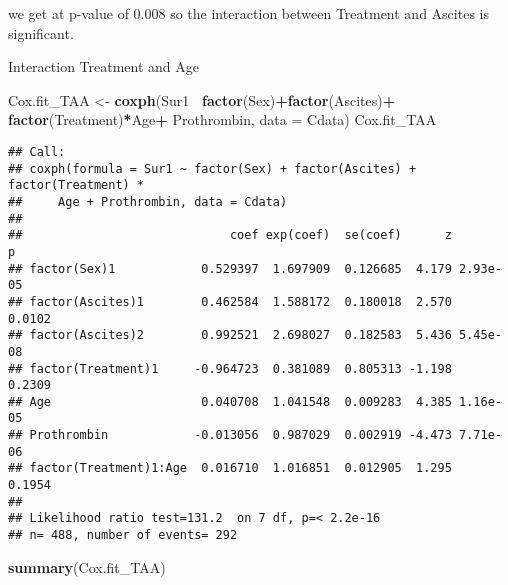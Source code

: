 \documentclass[
]{article}
\newenvironment{Shaded}{\begin{snugshade}}{\end{snugshade}}
\newcommand{\DataTypeTok}[1]{\textcolor[rgb]{0.13,0.29,0.53}{#1}}
\newcommand{\KeywordTok}[1]{\textcolor[rgb]{0.13,0.29,0.53}{\textbf{#1}}}
\newcommand{\NormalTok}[1]{#1}
\newcommand{\OperatorTok}[1]{\textcolor[rgb]{0.81,0.36,0.00}{\textbf{#1}}}
\newcommand{\StringTok}[1]{\textcolor[rgb]{0.31,0.60,0.02}{#1}}
\begin{document}
we get at p-value of 0.008 so the interaction between Treatment and
Ascites is significant.

Interaction Treatment and Age

\begin{Shaded}
\begin{Highlighting}[]
\NormalTok{Cox.fit_TAA <-}\StringTok{ }\KeywordTok{coxph}\NormalTok{(Sur1}\OperatorTok{~}\StringTok{ }\KeywordTok{factor}\NormalTok{(Sex)}\OperatorTok{+}\KeywordTok{factor}\NormalTok{(Ascites)}\OperatorTok{+}\StringTok{ }\KeywordTok{factor}\NormalTok{(Treatment)}\OperatorTok{*}\NormalTok{Age}\OperatorTok{+}\StringTok{ }\NormalTok{Prothrombin, }\DataTypeTok{data =}\NormalTok{ Cdata)}
\NormalTok{Cox.fit_TAA}
\end{Highlighting}
\end{Shaded}

\begin{verbatim}
## Call:
## coxph(formula = Sur1 ~ factor(Sex) + factor(Ascites) + factor(Treatment) * 
##     Age + Prothrombin, data = Cdata)
## 
##                             coef exp(coef)  se(coef)      z        p
## factor(Sex)1            0.529397  1.697909  0.126685  4.179 2.93e-05
## factor(Ascites)1        0.462584  1.588172  0.180018  2.570   0.0102
## factor(Ascites)2        0.992521  2.698027  0.182583  5.436 5.45e-08
## factor(Treatment)1     -0.964723  0.381089  0.805313 -1.198   0.2309
## Age                     0.040708  1.041548  0.009283  4.385 1.16e-05
## Prothrombin            -0.013056  0.987029  0.002919 -4.473 7.71e-06
## factor(Treatment)1:Age  0.016710  1.016851  0.012905  1.295   0.1954
## 
## Likelihood ratio test=131.2  on 7 df, p=< 2.2e-16
## n= 488, number of events= 292
\end{verbatim}

\begin{Shaded}
\begin{Highlighting}[]
\KeywordTok{summary}\NormalTok{(Cox.fit_TAA)}
\end{Highlighting}
\end{Shaded}
\end{document}
